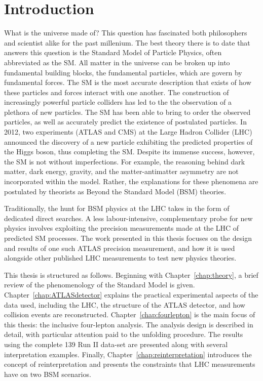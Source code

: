 \chapter{Introduction}
\label{chap:intro}
What is the universe made of? This question has fascinated both philosophers and scientist alike for the past millenium. The best theory there is to date that answers this question is the Standard Model of Particle Physics, often abbreviated as the SM. All matter in the universe can be broken up into fundamental building blocks, the fundamental particles, which are govern by fundamental forces. The SM is the most accurate description that exists of how these particles and forces interact with one another. The construction of increasingly powerful particle colliders has led to the the observation of a plethora of new particles. The SM has been able to bring to order the observed particles, as well as accurately predict the existence of postulated particles. In 2012, two experiments (ATLAS and CMS) at the Large Hadron Collider (LHC) announced the discovery of a new particle exhibiting the predicted properties of the Higgs boson, thus completing the SM. Despite its immense success, however, the SM is not without imperfections. For example, the reasoning behind dark matter, dark energy, gravity, and the matter-antimatter asymmetry are not incorporated within the model. Rather, the explanations for these phenomena are postulated by theorists as Beyond the Standard Model (BSM) theories. 

Traditionally, the hunt for BSM physics at the LHC takes in the form of dedicated direct searches. A less labour-intensive, complementary probe for new physics involves exploiting the precision measurements made at the LHC of predicted SM processes. The work presented in this thesis focuses on the design and results of one such ATLAS precision measurement, and how it is used alongside other published LHC measurements to test new physics theories.

This thesis is structured as follows. Beginning with Chapter~\ref{chap:theory}, a brief review of the phenomenology of the Standard Model is given. Chapter~\ref{chap:ATLASdetector} explains the practical experimental aspects of the data used, including the LHC, the structure of the ATLAS detector, and how collision events are reconstructed. Chapter~\ref{chap:fourlepton} is the main focus of this thesis: the \ATLAS inclusive four-lepton analysis. The analysis design is described in detail, with particular attention paid to the unfolding procedure. The results using the complete \unit{139}{\invfb} Run II data-set are presented along with several interpretation examples. Finally, Chapter~\ref{chap:reinterpretation} introduces the concept of reinterpretation and presents the constraints that LHC measurements have on two BSM scenarios. 

